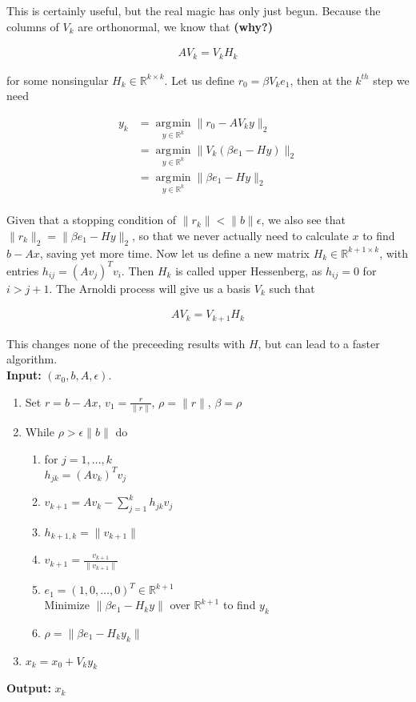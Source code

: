 \documentclass[11pt]{article}
\DeclareMathOperator*{\argmin}{\arg\!\min}
\begin{document}
This is certainly useful, but the real magic has only just begun. Because the columns of $V_k$ are orthonormal, we know that \textbf{(why?)}

\begin{align*}
  AV_k = V_k H_k
\end{align*}

for some nonsingular $H_k \in \mathbb{R}^{k \times k}$. Let us define $r_0 = \beta V_k e_1$, then at the $k^{th}$ step we need

\begin{align*}
  y_k &= \argmin \limits_{y \in \mathbb{R}^k} \| r_0 - A V_k y\|_2 \\
  &= \argmin \limits_{y \in \mathbb{R}^k} \| V_k( \beta e_1 - H y)\|_2 \\
  &= \argmin \limits_{y \in \mathbb{R}^k} \| \beta e_1 - H y\|_2 \\
\end{align*}

Given that a stopping condition of $\| r_k \| < \| b \| \epsilon$, we also see that $\| r_k \|_2 = \| \beta e_1 - H y\|_2$, so that we never actually need to calculate $x$ to find $b - Ax$, saving yet more time. Now let us define a new matrix $H_k \in \mathbb{R}^{k+1 \times k}$, with entries $h_{ij} = (Av_j)^Tv_i$. Then $H_k$ is called upper Hessenberg, as $h_{ij} = 0$ for $i > j + 1$. The Arnoldi process will give us a basis $V_k$ such that

\begin{align*}
  A V_k = V_{k+1} H_k
\end{align*}

This changes none of the preceeding results with $H$, but can lead to a faster algorithm. \\

\textbf{Input:} $(x_0, b, A, \epsilon)$.
\begin{enumerate}
\item Set $r = b - Ax$, $v_1 = \frac{r}{\| r \|}$, $\rho = \| r \|$, $\beta = \rho$
\item While $\rho > \epsilon \| b \|$ do
  \begin{enumerate}
  \item for $j = 1, \dots, k$ \\
    $h_{jk} = (A v_k)^T v_j$
  \item $v_{k+1} = A v_k - \sum \limits_{j=1}^k h_{jk} v_j$
  \item $h_{k+1,k} = \| v_{k+1} \|$
  \item $ v_{k+1} = \frac{v_{k+1}}{\| v_{k+1} \|}$
  \item $e_1 = (1, 0,\dots, 0)^T \in \mathbb{R}^{k+1}$ \\
    Minimize $\| \beta e_1 - H_k y \|$ over $\mathbb{R}^{k+1}$ to find $y_k$
  \item $\rho = \| \beta e_1 - H_k y_k \|$
\end{enumerate}
\item $x_k = x_0 + V_k y_k$
\end{enumerate}
\textbf{Output:} $x_k$ \\
\end{document}
